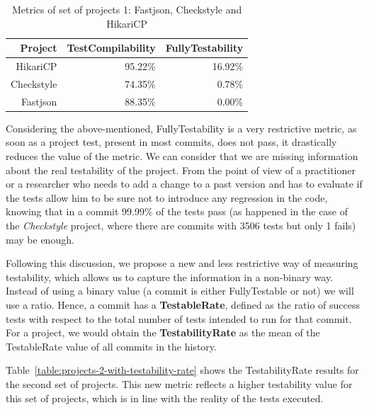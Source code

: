 \begin{figure}[!htb]
\begin{minipage}{.5\linewidth}
        \label{fig:hikari}
    \end{minipage}%
\end{figure}

\begin{table}[h!]
    \centering
    \begin{tabular}{|r|r|r|}
    \hline
    \textbf{Project} & \textbf{TestCompilability} & \textbf{FullyTestability} \\ \hline
    HikariCP         & 95.22\%                      & 16.92\%                      \\ \hline
    Checkstyle       & 74.35\%                      & 0.78\%                      \\ \hline
    Fastjson         & 88.35\%                      & 0.00\%                      \\ \hline
    \end{tabular}
    \caption{Metrics of set of projects 1: Fastjson, Checkstyle and HikariCP}
    \label{table:projects-2}
\end{table}

Considering the above-mentioned, FullyTestability is a very restrictive metric, as soon as a project test, present in most commits, does not pass, it drastically reduces the value of the metric. 
We can consider that we are missing information about the real testability of the project.
From the point of view of a practitioner or a researcher who needs to add a change to a past version and has to evaluate if the tests allow him to be sure not to introduce any regression in the code, knowing that in a commit 99.99\% of the tests pass (as happened in the case of the \textit{Checkstyle} project, where there are commits with 3506 tests but only 1 fails) may be enough.

Following this discussion, we propose a new and less restrictive way of measuring testability, which allows us to capture the information in a non-binary way. 
Instead of using a binary value (a commit is either FullyTestable or not) we will use a ratio. 
Hence, a commit has a \textbf{TestableRate}, defined as the ratio of success tests with respect to the total number of tests intended to run for that commit.
For a project, we would obtain the \textbf{TestabilityRate} as the mean of the TestableRate value of all commits in the history.

Table~\ref{table:projects-2-with-testability-rate} shows the TestabilityRate results for the second set of projects.
This new metric reflects a higher testability value for this set of projects, which is in line with the reality of the tests executed.

